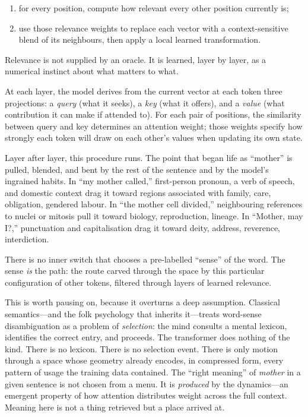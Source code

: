 \begin{enumerate}
  \item for every position, compute how relevant every other position currently is;
  \item use those relevance weights to replace each vector with a context-sensitive blend of its neighbours, then apply a local learned transformation.
\end{enumerate}

Relevance is not supplied by an oracle. It is learned, layer by layer, as a numerical instinct about what matters to what.

At each layer, the model derives from the current vector at each token three projections: a \emph{query} (what it seeks), a \emph{key} (what it offers), and a \emph{value} (what contribution it can make if attended to). For each pair of positions, the similarity between query and key determines an attention weight; those weights specify how strongly each token will draw on each other's values when updating its own state.

Layer after layer, this procedure runs. The point that began life as ``mother'' is pulled, blended, and bent by the rest of the sentence and by the model's ingrained habits. In ``my mother called,'' first-person pronoun, a verb of speech, and domestic context drag it toward regions associated with family, care, obligation, gendered labour. In ``the mother cell divided,'' neighbouring references to nuclei or mitosis pull it toward biology, reproduction, lineage. In ``Mother, may I?,'' punctuation and capitalisation drag it toward deity, address, reverence, interdiction.

There is no inner switch that chooses a pre-labelled ``sense'' of the word. The sense \emph{is} the path: the route carved through the space by this particular configuration of other tokens, filtered through layers of learned relevance.

This is worth pausing on, because it overturns a deep assumption. Classical semantics---and the folk psychology that inherits it---treats word-sense disambiguation as a problem of \emph{selection}: the mind consults a mental lexicon, identifies the correct entry, and proceeds. The transformer does nothing of the kind. There is no lexicon. There is no selection event. There is only motion through a space whose geometry already encodes, in compressed form, every pattern of usage the training data contained. The ``right meaning'' of \emph{mother} in a given sentence is not chosen from a menu. It is \emph{produced} by the dynamics---an emergent property of how attention distributes weight across the full context. Meaning here is not a thing retrieved but a place arrived at.

